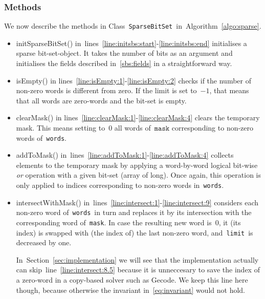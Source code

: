 \documentclass[a4paper,11pt]{article}
\newcommand{\Secref}[1]{Section~\ref{#1}}
\newcommand{\Algoref}[1]{Algorithm~\ref{#1}}
\newcommand{\lineref}[1]{line~\ref{#1}}
\newcommand{\linesref}[2]{lines~\ref{#1}-\ref{#2}}
\newcommand{\Eqref}[1]{\eqref{#1}}
\newcommand{\Words}{\texttt{words}}
\newcommand{\Index}{\texttt{index}}
\newcommand{\Mask}{\texttt{mask}}
\newcommand{\Limit}{\texttt{limit}}
\newcommand{\SparseBitSet}{\texttt{SparseBitSet}}
\numberwithin{equation}{section}
\begin{document}

\subsubsection{Methods}
We now describe the methods in Class~\SparseBitSet~in~\Algoref{algo:sparse}.

\begin{itemize}
  \item initSparseBitSet() in~\linesref{line:initsbs:start}{line:initsbs:end}
    initialises a sparse bit-set-object. It takes 
    the number of bits as an argument and initialises the fields
    described in~\ref{sbs:fields} in a straightforward way.

  \item isEmpty() in lines~\ref{line:isEmpty:1}-\ref{line:isEmpty:2} checks
    if the number of non-zero words is different from zero. If the limit is
    set to~$-1$, that means that all words are zero-words and the bit-set
    is empty.

  \item clearMask() in lines~\ref{line:clearMask:1}-\ref{line:clearMask:4}
    clears the temporary mask. This means setting to~$0$ all words of~$\Mask$
    corresponding to non-zero words of~\Words.

  \item addToMask() in~\linesref{line:addToMask:1}{line:addToMask:4} collects
    elements to the temporary mask by applying a word-by-word logical bit-wise
    \emph{or} operation with a given bit-set (array of long).
    Once again, this operation is only applied to indices corresponding to
    non-zero words in~\Words.

  \item intersectWithMask() in~\linesref{line:intersect:1}{line:intersect:9}
    considers each non-zero word of~\Words~in turn
    and replaces it by its intersection with the corresponding word of~\Mask.
    In case the resulting new word is~$0$, it (its index) is swapped with
    (the index of) the last non-zero word, and~\Limit~is
    decreased by one.
    
    In~\Secref{sec:implementation} we will see that the implementation
    actually can skip~\lineref{line:intersect:8.5} because it is unneccesary
    to save the index of a zero-word in a copy-based solver such as Gecode.
    We keep this
    line here though, because otherwise the invariant in~\Eqref{eq:invariant} 
    would not hold.
    

\end{itemize}
\end{document}
